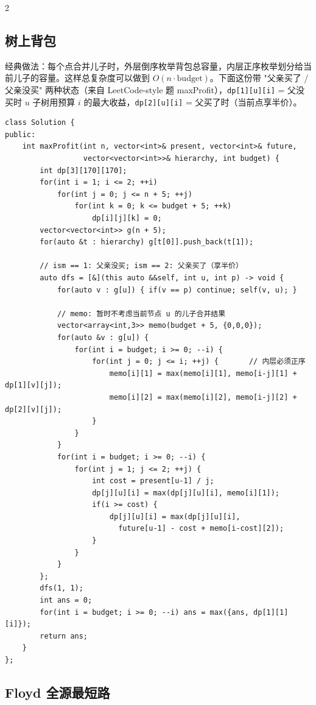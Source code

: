 \begin{multicols*}{2}
		\subsection{树上背包}

		经典做法：每个点合并儿子时，外层倒序枚举背包总容量，内层正序枚举划分给当前儿子的容量。这样总复杂度可以做到 $O(n \cdot \mathrm{budget})$。下面这份带 "父亲买了 / 父亲没买" 两种状态（来自 LeetCode-style 题 maxProfit），\texttt{dp[1][u][i]} = 父没买时 $u$ 子树用预算 $i$ 的最大收益，\texttt{dp[2][u][i]} = 父买了时（当前点享半价）。

		\begin{verbatim}
class Solution {
public:
    int maxProfit(int n, vector<int>& present, vector<int>& future,
                  vector<vector<int>>& hierarchy, int budget) {
        int dp[3][170][170];
        for(int i = 1; i <= 2; ++i)
            for(int j = 0; j <= n + 5; ++j)
                for(int k = 0; k <= budget + 5; ++k)
                    dp[i][j][k] = 0;
        vector<vector<int>> g(n + 5);
        for(auto &t : hierarchy) g[t[0]].push_back(t[1]);

        // ism == 1: 父亲没买; ism == 2: 父亲买了（享半价）
        auto dfs = [&](this auto &&self, int u, int p) -> void {
            for(auto v : g[u]) { if(v == p) continue; self(v, u); }

            // memo: 暂时不考虑当前节点 u 的儿子合并结果
            vector<array<int,3>> memo(budget + 5, {0,0,0});
            for(auto &v : g[u]) {
                for(int i = budget; i >= 0; --i) {
                    for(int j = 0; j <= i; ++j) {       // 内层必须正序
                        memo[i][1] = max(memo[i][1], memo[i-j][1] + dp[1][v][j]);
                        memo[i][2] = max(memo[i][2], memo[i-j][2] + dp[2][v][j]);
                    }
                }
            }
            for(int i = budget; i >= 0; --i) {
                for(int j = 1; j <= 2; ++j) {
                    int cost = present[u-1] / j;
                    dp[j][u][i] = max(dp[j][u][i], memo[i][1]);
                    if(i >= cost) {
                        dp[j][u][i] = max(dp[j][u][i],
                          future[u-1] - cost + memo[i-cost][2]);
                    }
                }
            }
        };
        dfs(1, 1);
        int ans = 0;
        for(int i = budget; i >= 0; --i) ans = max({ans, dp[1][1][i]});
        return ans;
    }
};
		\end{verbatim}


		\subsection{Floyd 全源最短路}


\end{multicols*}
